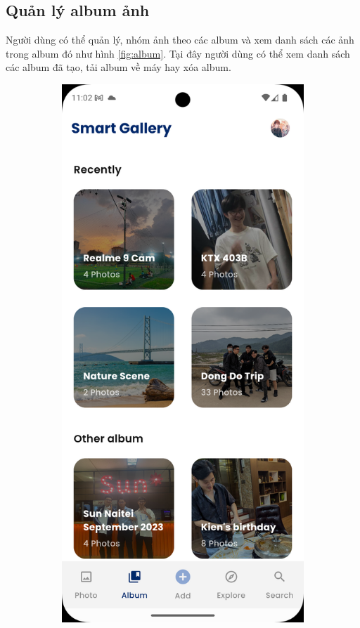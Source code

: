 \subsection{Quản lý album ảnh}

Người dùng có thể quản lý, nhóm ảnh theo các album và xem danh sách các ảnh trong album đó như hình \ref{fig:album}. Tại đây người dùng có thể xem danh sách các album đã tạo, tải album về máy hay xóa album.

\begin{figure}[H]
    \centering
    \begin{subfigure}{0.48\textwidth}
        \includegraphics[width=1\linewidth]{figures/c4/4-2/album_1.png} 

\end{subfigure}
\end{figure}
